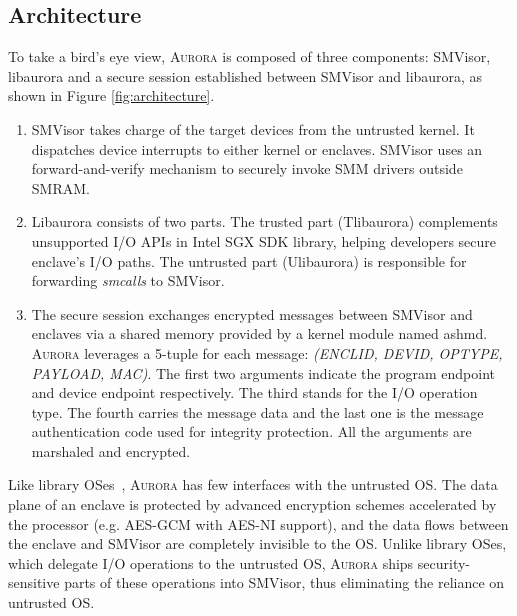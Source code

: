 \subsection{Architecture}\label{arch}

To take a bird's eye view, \textsc{Aurora} is composed of three components: SMVisor, libaurora and a secure session established between SMVisor and libaurora, as shown in Figure \ref{fig:architecture}.

\begin{enumerate}%
\item SMVisor takes charge of the target devices from the untrusted kernel. It dispatches device interrupts to either kernel or enclaves. SMVisor uses an forward-and-verify mechanism to securely invoke SMM drivers outside SMRAM.
\item Libaurora consists of two parts. The trusted part (Tlibaurora) complements unsupported I/O APIs in Intel SGX SDK library, helping developers secure enclave's I/O paths. The untrusted part (Ulibaurora) is responsible for forwarding \textit{smcalls} to SMVisor.  %
\item The secure session exchanges encrypted messages between SMVisor and enclaves via a shared memory provided by a kernel module named ashmd.  \textsc{Aurora} leverages a 5-tuple for each message: \textit{(ENCLID, DEVID, OPTYPE, PAYLOAD, MAC)}. The first two arguments indicate the program endpoint and device endpoint respectively.  The third stands for the I/O operation type. The fourth carries the message data and the last one is the message authentication code used for integrity protection. All the arguments are marshaled and encrypted. 

\end{enumerate}

Like library OSes~\cite{DBLP:journals/tocs/BaumannPH15, DBLP:conf/usenix/TsaiPV17, shinde_panoply:_2017}, \textsc{Aurora} has few interfaces with the untrusted OS. %
The data plane of an enclave is protected by advanced encryption schemes accelerated by the processor (e.g. AES-GCM with AES-NI support), and the data flows between the enclave and SMVisor are completely invisible to the OS. Unlike library OSes, which delegate I/O operations to the untrusted OS, \textsc{Aurora} ships security-sensitive parts of these operations into SMVisor, thus eliminating the reliance on untrusted OS.

